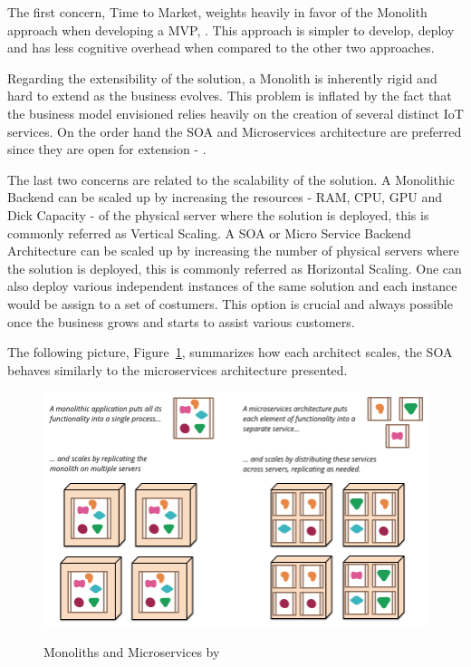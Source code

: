 The first concern, Time to Market, weights heavily in favor of the Monolith approach when developing a \gls{MVP}, \cite{atlassianmono}. This approach is simpler to develop, deploy and has less cognitive overhead when compared to the other two approaches.

Regarding the extensibility of the solution, a Monolith is inherently rigid and hard to extend as the business evolves. This problem is inflated by the fact that the business model envisioned relies heavily on the creation of several distinct \gls{IoT} services. On the order hand the \gls{SOA} and Microservices architecture are preferred since they are open for extension - \cite{microsoftmicro}. 

The last two concerns are related to the scalability of the solution. A Monolithic Backend can be scaled up by increasing the resources - RAM, CPU, GPU and Dick Capacity - of the physical server where the solution is deployed, this is commonly referred as Vertical Scaling. A \gls{SOA} or Micro Service Backend Architecture can be scaled up by increasing the number of physical servers where the solution is deployed, this is commonly referred as Horizontal Scaling.
One can also deploy various independent instances of the same solution and each instance would be assign to a set of costumers. This option is crucial and always possible once the business grows and starts to assist various customers.

The following picture, Figure~\ref{fig:design:alternatives:auth:backend:scale}, summarizes how each architect scales, the \gls{SOA} behaves similarly to the microservices architecture presented.

\begin{figure}[H]
   \centering
   \resizebox{\columnwidth}{!}
   {
      \includegraphics{assets/figures/microservices.png}
   }
   \caption[Monoliths and Microservices]{Monoliths and Microservices by \cite{martinmicro}}
   \label{fig:design:alternatives:auth:backend:scale}
\end{figure}

